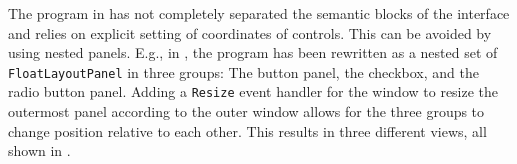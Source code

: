 \documentclass[fsharpnotes.tex]{subfiles}
\begin{document}
The program in  has not completely separated the semantic blocks of the interface and relies on explicit setting of coordinates of controls. This can be avoided by using nested panels. E.g., in , the program has been rewritten as a nested set of \lstinline{FloatLayoutPanel} in three groups: The button panel, the checkbox, and the radio button panel. Adding a \lstinline{Resize} event handler for the window to resize the outermost panel according to the outer window allows for the three groups to change position relative to each other. This results in three different views, all shown in .
%
%
%
\end{document}
